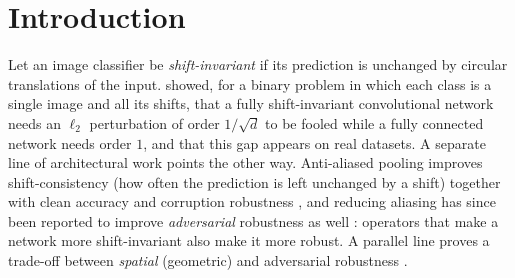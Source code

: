 \documentclass{article}
\theoremstyle{definition}
\newcommand{\dd}{d}
\begin{document}
\section{Introduction}\label{sec:intro}
Let an image classifier be \emph{shift-invariant} if its prediction is unchanged by circular translations of the input. \citet{ge2021shift} showed, for a binary problem in which each class is a single image and all its shifts, that a fully shift-invariant convolutional network needs an $\ell_2$ perturbation of order $1/\sqrt{\dd}$ to be fooled while a fully connected network needs order $1$, and that this gap appears on real datasets. A separate line of architectural work points the other way. Anti-aliased pooling improves shift-consistency (how often the prediction is left unchanged by a shift) together with clean accuracy and corruption robustness \citep{zhang2019making}, and reducing aliasing has since been reported to improve \emph{adversarial} robustness as well \citep{grabinski2022aliasing,rodriguezmunoz2022aliasing,saha2024improving}: operators that make a network more shift-invariant also make it more robust. A parallel line proves a trade-off between \emph{spatial} (geometric) and adversarial robustness \citep{kamath2021canwehaveitall,tramer2019multiple}.
\end{document}
